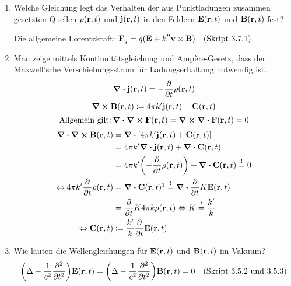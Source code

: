 \begin{enumerate}
  \item Welche Gleichung legt das Verhalten der aus Punktladungen
        zusammen gesetzten Quellen $\rho(\vb r, t)$ und 
        $\vb j(\vb r, t)$ in den Feldern $\vb E(\vb r, t)$
        und $\vb B(\vb r, t)$ fest?
        \begin{center}
          Die allgemeine Lorentzkraft: 
          $\displaystyle \vb F_q=q\qty(\vb E+k''\vb v\times\vb B)\quad\text{(Skript 3.7.1)}$
        \end{center}

  \item Man zeige mittels Kontinuitätsgleichung und Ampère-Gesetz, 
        dass der Maxwell'sche Verschiebungsstrom für Ladungserhaltung
        notwendig ist.
        $$\div \vb j(\vb r, t) = -\pdv{t}\rho(\vb r ,t)$$
        $$\curl\vb B(\vb r, t) \coloneqq 
        4\pi k'\vb j(\vb r ,t) + \vb C(\vb r, t)$$
        $$\text{Allgemein gilt:}\,\div\curl\vb F(\vb r, t)
        =\curl \div \vb F(\vb r, t)=0$$
        \begin{equation*}
          \begin{split}
          \ds \div\curl\vb B(\vb r, t)
                      &\ds= \div \qty[
                      4\pi k'\vb j(\vb r, t)+\vb C(\vb r, t)]\\
                      &\ds= 4\pi k'\div\vb j(\vb r,t) +
                      \div \vb C(\vb r,t)\\
                      &\ds= 4\pi k'\qty(-\pdv{t}\rho(\vb r, t)) 
                      +\div \vb C(\vb r,t)\stackrel{!}{=}0\\
          \Leftrightarrow\ds 4\pi k'\pdv{t}\rho(\vb r, t) 
                      &\ds =\div \vb 
                      C(\vb r, t)\footnotemark
                      \stackrel{!}{=}\div \pdv{t}K\vb E(\vb r, t)\\
                      &\ds =\ds \pdv{t} 
                      K4\pi k \rho(\vb r, t)
          \Leftrightarrow K         
                      \stackrel{!}{=}\frac{k'}{k}\\
          \Leftrightarrow \vb C(\vb r,t)
                      &\coloneqq \frac{k'}{k}\pdv{t}\vb E(\vb r, t)
          \end{split}
        \end{equation*}

  \item Wie lauten die Wellengleichungen für $\vb E(\vb r, t)$ und
        $\vb B(\vb r, t)$ im Vakuum?
        $$\qty(\Delta - \frac{1}{c^2}\pdv[2]{t})\vb E(\vb r, t)=
        \qty(\Delta - \frac{1}{c^2}\pdv[2]{t})\vb B(\vb r, t)=0
        \quad\text{(Skript 3.5.2 und 3.5.3)}$$


\end{enumerate}
